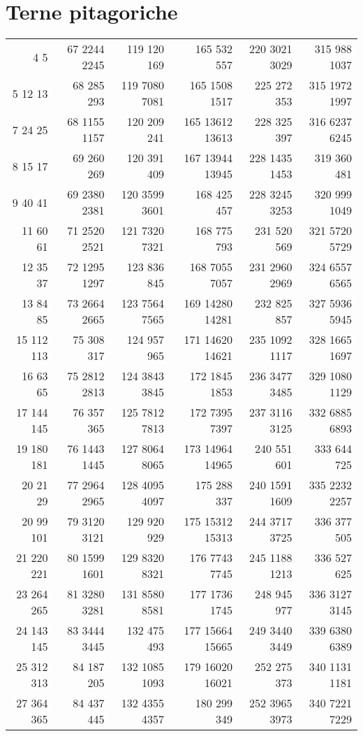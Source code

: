 \section{Terne pitagoriche}
\begin{center}
\footnotesize
\begin{longtable}[c]{*{6}{r}}
	\toprule\endhead
\bottomrule \endfoot
3 4 5&67 2244 2245&119 120 169&165 532 557&220 3021 3029&315 988 1037\\
5 12 13&68 285 293&119 7080 7081&165 1508 1517&225 272 353&315 1972 1997\\
7 24 25&68 1155 1157&120 209 241&165 13612 13613&228 325 397&316 6237 6245\\
8 15 17&69 260 269&120 391 409&167 13944 13945&228 1435 1453&319 360 481\\
9 40 41&69 2380 2381&120 3599 3601&168 425 457&228 3245 3253&320 999 1049\\
11 60 61&71 2520 2521&121 7320 7321&168 775 793&231 520 569&321 5720 5729\\
12 35 37&72 1295 1297&123 836 845&168 7055 7057&231 2960 2969&324 6557 6565\\
13 84 85&73 2664 2665&123 7564 7565&169 14280 14281&232 825 857&327 5936 5945\\
15 112 113&75 308 317&124 957 965&171 14620 14621&235 1092 1117&328 1665 1697\\
16 63 65&75 2812 2813&124 3843 3845&172 1845 1853&236 3477 3485&329 1080 1129\\
17 144 145&76 357 365&125 7812 7813&172 7395 7397&237 3116 3125&332 6885 6893\\
19 180 181&76 1443 1445&127 8064 8065&173 14964 14965&240 551 601&333 644 725\\
20 21 29&77 2964 2965&128 4095 4097&175 288 337&240 1591 1609&335 2232 2257\\
20 99 101&79 3120 3121&129 920 929&175 15312 15313&244 3717 3725&336 377 505\\
21 220 221&80 1599 1601&129 8320 8321&176 7743 7745&245 1188 1213&336 527 625\\
23 264 265&81 3280 3281&131 8580 8581&177 1736 1745&248 945 977&336 3127 3145\\
24 143 145&83 3444 3445&132 475 493&177 15664 15665&249 3440 3449&339 6380 6389\\
25 312 313&84 187 205&132 1085 1093&179 16020 16021&252 275 373&340 1131 1181\\
27 364 365&84 437 445&132 4355 4357&180 299 349&252 3965 3973&340 7221 7229\\

\end{longtable}
\end{center}
